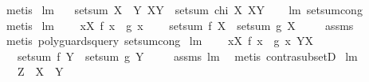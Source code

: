 \begin{isabellebody}
\ metis%
\endisatagproof
{\isafoldproof}%
%
\isadelimproof
\isanewline
%
\endisadelimproof
\isanewline
{}\isamarkupfalse%
\ lm{}{}{}{\isacharcolon}\ \isanewline
\ \ {\isachardoublequoteopen}setsum\ {\isacharparenleft}X\ {\isacharless}{\isacharbar}\ Y{\isacharparenright}\ {\isacharparenleft}X{\isasymunion}Y{\isacharparenright}\ {\isacharequal}\ setsum\ {\isacharparenleft}chi\ X{\isacharparenright}\ {\isacharparenleft}X{\isasymunion}Y{\isacharparenright}{\isachardoublequoteclose}\isanewline
%
\isadelimproof
\ \ %
\endisadelimproof
%
\isatagproof
{}\isamarkupfalse%
\ lm{}{}{}\ setsum{\isachardot}cong\ \isamarkupfalse%
\ metis%
\endisatagproof
{\isafoldproof}%
%
\isadelimproof
\isanewline
%
\endisadelimproof
\isanewline
{}\isamarkupfalse%
\ lm{}{}{}{\isacharcolon}\ \isanewline
\ \ \ {\isachardoublequoteopen}{\isasymforall}x{\isasymin}X{\isachardot}\ f\ x\ {\isacharequal}\ g\ x{\isachardoublequoteclose}\ \isanewline
\ \ \ {\isachardoublequoteopen}setsum\ f\ X\ {\isacharequal}\ setsum\ g\ X{\isachardoublequoteclose}\ \isanewline
%
\isadelimproof
\ \ %
\endisadelimproof
%
\isatagproof
{}\isamarkupfalse%
\ assms\ \isamarkupfalse%
\ {\isacharparenleft}metis\ {\isacharparenleft}poly{\isacharunderscore}guards{\isacharunderscore}query{\isacharparenright}\ setsum{\isachardot}cong{\isacharparenright}%
\endisatagproof
{\isafoldproof}%
%
\isadelimproof
\isanewline
%
\endisadelimproof
\isanewline
{}\isamarkupfalse%
\ lm{}{}{}{\isacharcolon}\ \isanewline
\ \ \ {\isachardoublequoteopen}{\isasymforall}x{\isasymin}X{\isachardot}\ f\ x\ {\isacharequal}\ g\ x{\isachardoublequoteclose}\ {\isachardoublequoteopen}Y{\isasymsubseteq}X{\isachardoublequoteclose}\ \isanewline
\ \ \ {\isachardoublequoteopen}setsum\ f\ Y\ {\isacharequal}\ setsum\ g\ Y{\isachardoublequoteclose}\ \isanewline
%
\isadelimproof
\ \ %
\endisadelimproof
%
\isatagproof
{}\isamarkupfalse%
\ assms\ lm{}{}{}\ \isamarkupfalse%
\ {\isacharparenleft}metis\ contra{\isacharunderscore}subsetD{\isacharparenright}%
\endisatagproof
{\isafoldproof}%
%
\isadelimproof
\isanewline
%
\endisadelimproof
\isanewline
{}\isamarkupfalse%
\ lm{}{}{}{\isacharcolon}\ \isanewline
\ \ \ {\isachardoublequoteopen}Z\ {\isasymsubseteq}\ X\ {\isasymunion}\ Y{\isachardoublequoteclose}\ \isanewline

\end{isabellebody}
